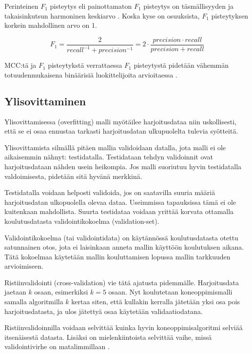 \documentclass[finnish,twoside,openright]{HYgraduMLDS}
\begin{document}
Perinteinen $F_1$ pisteytys eli painottamaton $F_1$ pisteytys on täsmällisyyden ja takaisinkutsun harmoninen keskiarvo \cite{sasaki2007truth}. Koska kyse on osuuksista, $F_1$ pisteytyksen korkein mahdollinen arvo on 1.

\begin{equation} \label{eq:f1}
    F_1 = \frac{2}{recall^{-1} + precision^{-1}} = 2 \cdot \frac{precision \cdot recall}{precision + recall}
\end{equation}


MCC:tä ja $F_1$ pisteytykstä verrattaessa $F_1$ pisteytystä pidetään vähemmän totuudenmukaisena binäärisiä luokittelijoita arvioitaessa \cite{chicco2020advantages}.


\subsection{Ylisovittaminen\label{section:ylisovittaminen}}

Ylisovittamisessa (overfitting) malli myötäilee harjoitusdataa niin uskollisesti, että se ei osaa ennustaa tarkasti harjoitusdatan ulkupuolelta tulevia syötteitä.

Ylisovittamista silmällä pitäen mallia validoidaan datalla, jota malli ei ole aikaisemmin nähnyt: testidatalla. Testidataan tehdyn validoinnit ovat harjoitusdataan nähden usein heikompia. Jos malli suoriutuu hyvin testidatalla valdoimisesta, pidetään sitä hyvänä merkkinä.

Testidatalla voidaan helposti validoida, jos on saatavilla suuria määriä harjoitusdatan ulkopuolella olevaa dataa. Useimmissa tapauksissa tämä ei ole kuitenkaan mahdollista. Suurta testidataa voidaan yrittää korvata ottamalla koulutusdatasta validointikokoelma (validation-set). 

Validointikokoelma (tai validointidata) on käytännössä koulutusdatasta otettu satunnainen otos, jota ei laisinkaan anneta mallin käyttöön koulutuksen aikana. Tätä kokoelmaa käytetään mallin kouluttamisen lopussa mallin tarkkuuden arvioimiseen. 

Ristiinvalidointi (cross-validation) vie tätä ajatusta pidemmälle. Harjoitusdata jaetaan $k$ osaan, esimerkiksi $k=5$ osaan. Nyt koulutetaan koneoppimismalli samalla algoritmilla $k$ kertaa siten, että kullakin kerralla jätetään yksi osa pois harjoitusdatasta, ja ulos jätettyä osaa käytetään validaatiodatana. 

Ristiinvalidoinnilla voidaan selvittää kuinka hyvin koneoppimisalgoritmi selviää itsenäisestä datasta. Lisäksi on mielenkiintoista selvittää vaihe, missä validointivirhe on matalimmillaan \cite{james2013ISLR}. 
\end{document}
